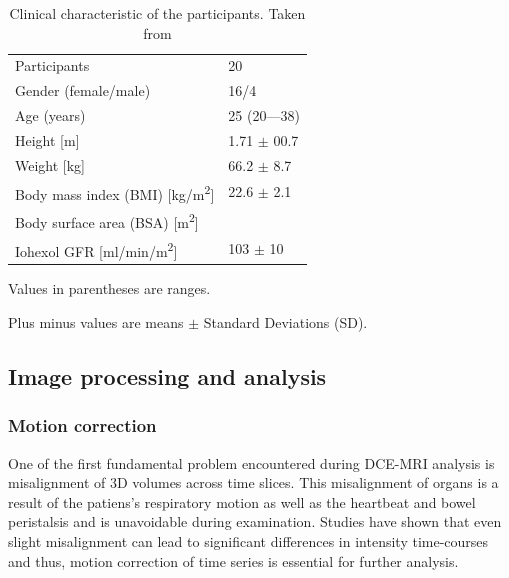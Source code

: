 \begin{table}[h!]
\centering
\caption[Clinical characteristic of the participants]{Clinical characteristic of the participants. Taken from \cite{eikefjord2017dynamic}}
\label{tab:participants}
\begin{threeparttable}
\renewcommand{\arraystretch}{1.25}
\begin{tabular}{m{8cm} m{2.25cm}}
	\hline

 	Participants & 20\\
  	Gender (female/male) &16/4\\
  	Age (years) & 25 (20---38)\\
  	Height [m] & 1.71 $\pm$ 00.7\\
  	Weight [kg] & 66.2 $\pm$ 8.7\\
  	Body mass index (BMI) [kg/m\textsuperscript{2}] & 22.6 $\pm$ 2.1\\
  	Body surface area (BSA) [m\textsuperscript{2}]& \\
  	Iohexol GFR [ml/min/m\textsuperscript{2}] &103 $\pm$ 10\\
  \hline

\end{tabular}
\begin{tablenotes}%
\footnotesize{}%
\item Values in parentheses are ranges.
\item Plus minus values are means $\pm$ Standard Deviations (SD).
    \end{tablenotes}
	\end{threeparttable}
\end{table}



\subsection{Image processing and analysis}
\subsubsection{Motion correction}
One of the first fundamental problem encountered during DCE-MRI analysis is misalignment of 3D volumes across time slices. This misalignment of organs is a result of the patiens's respiratory motion as well as the heartbeat and bowel peristalsis and is unavoidable during examination. Studies have shown that even slight misalignment can lead to significant differences in intensity time-courses \cite{KidneySubsegmentation} and thus, motion correction of time series is essential for further analysis.

